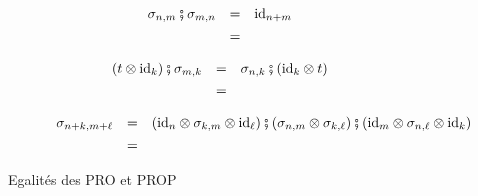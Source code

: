 \documentclass[12pt, a4paper]{article}
\newcommand{\tinyinput}[1]{\scalebox{0.44}{}}
\def\id{ \mathrm{id} }
\begin{document}
\begin{figure}[h]
{\begin{minipage}{0.982\linewidth}
\begin{center}
        \vspace{-0.5em}
        \begin{subfigure}{0.34\textwidth}
            \begin{equation}\label{eq:involution}
                \begin{array}{ccc}
                    \sigma_{n,m}\fatsemi\sigma_{m,n}&=&\id_{n+m}\\[.4em]
                    \tinyinput{fig/inv_left.tikz}&=&\tinyinput{fig/inv_right.tikz}
                \end{array}
            \end{equation}
        \end{subfigure}\hspace{2em}
        \begin{subfigure}{0.48\textwidth}
            \begin{equation}\label{eq:naturality}
                \begin{array}{ccc}
                    (t\otimes\id_k)\fatsemi\sigma_{m,k}&=&\sigma_{n,k}\fatsemi(\id_k\otimes t)\\[.4em]
                    \tinyinput{fig/pass_left.tikz}&=&\tinyinput{fig/pass_right.tikz}
                \end{array}
            \end{equation}
        \end{subfigure}

        \vspace{-0.5em}
        \begin{subfigure}{0.86\textwidth}
            \begin{equation}\label{eq:symmetryinduct}
                \begin{array}{ccc}
                    \sigma_{n+k,m+\ell}&=&(\id_n\otimes\sigma_{k,m}\otimes\id_\ell)\fatsemi(\sigma_{n,m}\otimes\sigma_{k,\ell})\fatsemi(\id_m\otimes\sigma_{n,\ell}\otimes\id_k)\\[.4em]
                    \tinyinput{fig/swap_decomp_left.tikz}&=&\tinyinput{fig/swap_decomp_right.tikz}
                \end{array}
            \end{equation}
        \end{subfigure}
        \vspace{0.2em}
    \end{center}\end{minipage}}
    \caption{
        \label{fig:coherencelaws}
        Egalités des PRO et PROP
    }
\end{figure}
\end{document}
